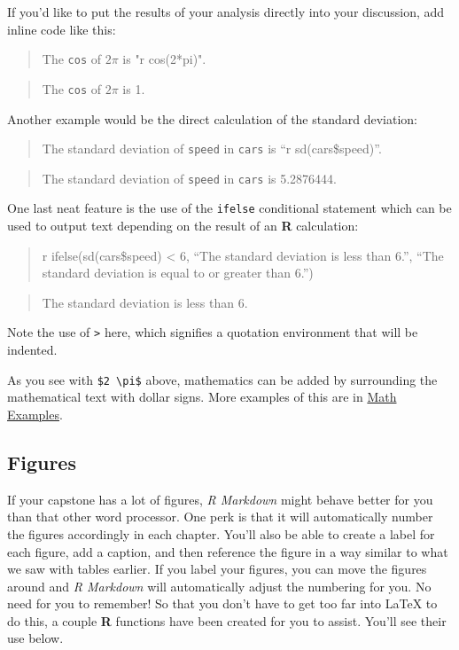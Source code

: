 \documentclass[12pt,oneside]{chicagocapstone}
\begin{document}
If you'd like to put the results of your analysis directly into your discussion, add inline code like this:
\begin{quote}
The \texttt{cos} of \(2 \pi\) is "r cos(2*pi)".
\end{quote}
\begin{quote}
The \texttt{cos} of \(2 \pi\) is 1.
\end{quote}
Another example would be the direct calculation of the standard deviation:
\begin{quote}
The standard deviation of \texttt{speed} in \texttt{cars} is ``r sd(cars\$speed)''.
\end{quote}
\begin{quote}
The standard deviation of \texttt{speed} in \texttt{cars} is 5.2876444.
\end{quote}
One last neat feature is the use of the \texttt{ifelse} conditional statement which can be used to output text depending on the result of an \textbf{R} calculation:
\begin{quote}
r ifelse(sd(cars\$speed) \textless{} 6, ``The standard deviation is less than 6.'', ``The standard deviation is equal to or greater than 6.'')
\end{quote}
\begin{quote}
The standard deviation is less than 6.
\end{quote}
Note the use of \texttt{\textgreater{}} here, which signifies a quotation environment that will be indented.

As you see with \texttt{\$2\ \textbackslash{}pi\$} above, mathematics can be added by surrounding the mathematical text with dollar signs. More examples of this are in \protect\hyperlink{math-examples}{Math Examples}.

\hypertarget{figures}{%
\subsection*{Figures}\label{figures}}

If your capstone has a lot of figures, \emph{R Markdown} might behave better for you than that other word processor. One perk is that it will automatically number the figures accordingly in each chapter. You'll also be able to create a label for each figure, add a caption, and then reference the figure in a way similar to what we saw with tables earlier. If you label your figures, you can move the figures around and \emph{R Markdown} will automatically adjust the numbering for you. No need for you to remember! So that you don't have to get too far into LaTeX to do this, a couple \textbf{R} functions have been created for you to assist. You'll see their use below.
\end{document}
